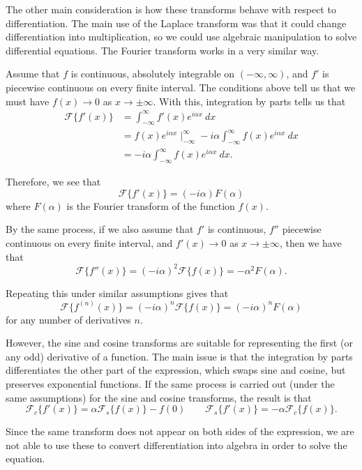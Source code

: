 The other main consideration is how these transforms behave with respect to differentiation. The main use of the Laplace transform was that it could change differentiation into multiplication, so we could use algebraic manipulation to solve differential equations. The Fourier transform works in a very similar way. 

Assume that $f$ is continuous, absolutely integrable on $(-\infty, \infty)$, and $f'$ is piecewise continuous on every finite interval. The conditions above tell us that we must have $f(x) \rightarrow 0$ as $x \rightarrow \pm \infty$. With this, integration by parts tells us that
\[ \begin{split}
\mathcal{F}\{f'(x)\} &= \int_{-\infty}^\infty f'(x)e^{i\alpha x}\ dx \\
&= f(x)e^{i\alpha x} \mid_{-\infty}^\infty - i\alpha \int_{-\infty}^\infty f(x)e^{i\alpha x}\ dx \\
&= -i\alpha \int_{-\infty}^\infty f(x)e^{i\alpha x}\ dx.
\end{split}
\]

Therefore, we see that
\[ \mathcal{F}\{f'(x)\} = (-i\alpha) F(\alpha) \] where $F(\alpha)$ is the Fourier transform of the function $f(x)$. 

By the same process, if we also assume that $f'$ is continuous, $f''$ piecewise continuous on every finite interval, and $f'(x) \rightarrow 0$ as $x \rightarrow \pm \infty$, then we have that
\[ \mathcal{F}\{f''(x) \} = (-i\alpha)^2 \mathcal{F}\{f(x)\} = -\alpha^2 F(\alpha). \]

Repeating this under similar assumptions gives that
\[ \mathcal{F}\{f^{(n)}(x) \} = (-i\alpha)^n \mathcal{F}\{f(x)\} = (-i\alpha)^n F(\alpha) \] for any number of derivatives $n$. 

However, the sine and cosine transforms are suitable for representing the first (or any odd) derivative of a function. The main issue is that the integration by parts differentiates the other part of the expression, which swaps sine and cosine, but preserves exponential functions. If the same process is carried out (under the same assumptions) for the sine and cosine transforms, the result is that
\[ \mathcal{F}_c\{f'(x)\} = \alpha \mathcal{F}_s\{f(x)\} - f(0) \qquad \mathcal{F}_s\{f'(x)\} = -\alpha \mathcal{F}_c\{f(x)\}.\] 

Since the same transform does not appear on both sides of the expression, we are not able to use these to convert differentiation into algebra in order to solve the equation. 

